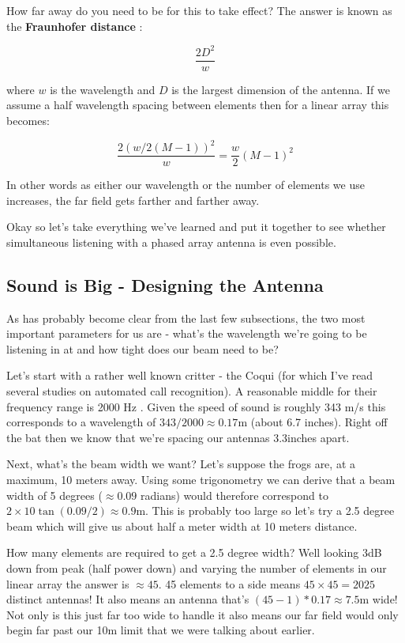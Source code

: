 \documentclass[10pt,a4paper]{article}
\begin{document}
How far away do you need to be for this to take effect? The answer is known as the \textbf{Fraunhofer distance} \cite{wikifarfield}:

\begin{equation}
\frac{2D^2}{w}
\end{equation}

where $w$ is the wavelength and $D$ is the largest dimension of the antenna. If we assume a half wavelength spacing between elements then for a linear array this becomes:

 
\begin{equation}
\frac{2(w/2(M-1))^2}{w}=\frac{w}{2}(M-1)^2
\end{equation}

In other words as either our wavelength or the number of elements we use increases, the far field gets farther and farther away. 

Okay so let's take everything we've learned and put it together to see whether simultaneous listening with a phased array antenna is even possible. 

\subsection{Sound is Big - Designing the Antenna}

As has probably become clear from the last few subsections, the two most important parameters for us are - what's the wavelength we're going to be listening in at and how tight does our beam need to be? 

Let's start with a rather well known critter - the Coqui (for which I've read several studies on automated call recognition). A reasonable middle for their frequency range is 2000 Hz \cite{mlcoqui}. Given the speed of sound is roughly 343 m/s this corresponds to a wavelength of $343/2000\approx 0.17$m (about 6.7 inches). Right off the bat then we know that we're spacing our antennas $3.3$inches apart. 

Next, what's the beam width we want? Let's suppose the frogs are, at a maximum, 10 meters away. Using some trigonometry we can derive that a beam width of 5 degrees ($\approx 0.09$ radians) would therefore correspond to $2\times 10 \tan(0.09/2)\approx0.9$m. This is probably too large so let's try a 2.5 degree beam which will give us about half a meter width at 10 meters distance. 

How many elements are required to get a 2.5 degree width? Well looking 3dB down from peak (half power down) and varying the number of elements in our linear array the answer is $\approx 45$. 45 elements to a side means $45\times45=2025$ distinct antennas! It also means an antenna that's $(45-1)*0.17\approx 7.5$m wide! Not only is this just far too wide to handle it also means our far field would only begin far past our 10m limit that we were talking about earlier. 
\end{document}
